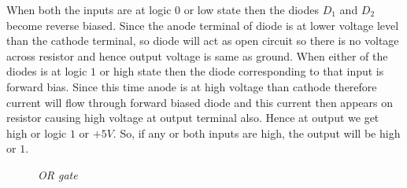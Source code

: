 		When both the inputs are at logic $0$ or low state then the diodes $D_1$ and $D_2$ become reverse biased. Since the anode terminal of diode is at lower voltage level than the cathode terminal, so diode will act as open circuit so there is no voltage across resistor and hence output voltage is same as ground. When either of the diodes is at logic $1$ or high state then the diode corresponding to that input is forward bias. Since this time anode is at high voltage than cathode therefore current will flow through forward biased diode and this current then appears on resistor causing high voltage at output terminal also. Hence at output we get high or logic $1$ or $+5V$. So, if any or both inputs are high, the output will be high or $1$.
		\begin{figure}[ht]
			\centering 
			\hfill
			\hfill
			\caption{\textit{OR gate}}
		\end{figure}
	
